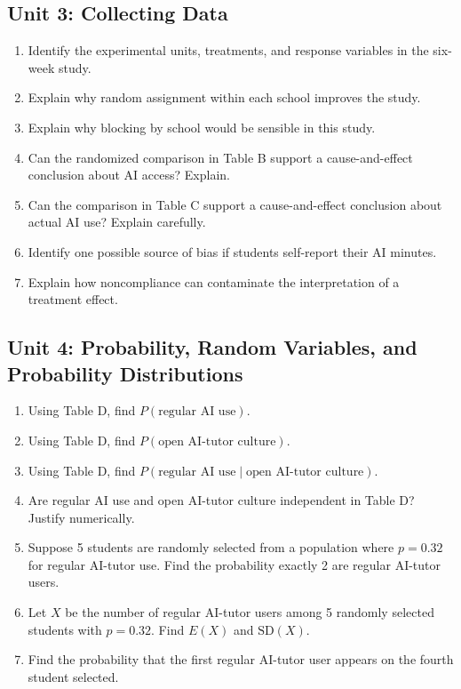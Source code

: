 \documentclass[11pt]{article}
\begin{document}
\subsection*{Unit 3: Collecting Data}
\begin{enumerate}[resume,leftmargin=*]
\item Identify the experimental units, treatments, and response
variables in the six-week study.
\item Explain why random assignment within each school improves the
study.
\item Explain why blocking by school would be sensible in this study.
\item Can the randomized comparison in Table B support a
cause-and-effect conclusion about AI access? Explain.
\item Can the comparison in Table C support a cause-and-effect
conclusion about actual AI use? Explain carefully.
\item Identify one possible source of bias if students self-report
their AI minutes.
\item Explain how noncompliance can contaminate the interpretation of
a treatment effect.
\end{enumerate}

\subsection*{Unit 4: Probability, Random Variables, and Probability Distributions}
\begin{enumerate}[resume,leftmargin=*]
\item Using Table D, find $P(\text{regular AI use})$.
\item Using Table D, find $P(\text{open AI-tutor culture})$.
\item Using Table D, find $P(\text{regular AI use} \mid \text{open AI-tutor culture})$.
\item Are regular AI use and open AI-tutor culture independent in
Table D? Justify numerically.
\item Suppose 5 students are randomly selected from a population
where $p = 0.32$ for regular AI-tutor use. Find the probability
exactly 2 are regular AI-tutor users.
\item Let $X$ be the number of regular AI-tutor users among 5
randomly selected students with $p = 0.32$. Find $E(X)$ and
$\text{SD}(X)$.
\item Find the probability that the first regular AI-tutor user
appears on the fourth student selected.
\end{enumerate}
\end{document}
